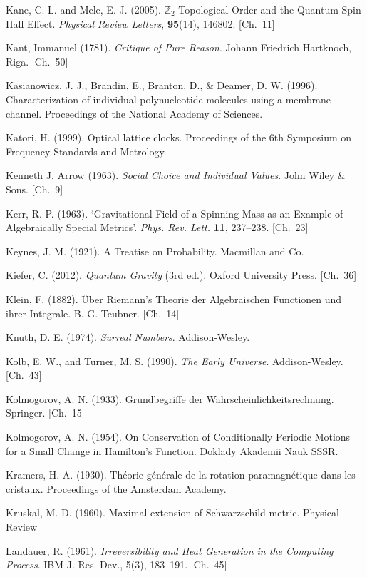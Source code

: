 \begin{list}{}{%
  \setlength{\leftmargin}{2em}%
  \setlength{\itemindent}{-2em}%
  \setlength{\itemsep}{0.35\baselineskip}%
  \setlength{\parsep}{0pt}%
  \setlength{\topsep}{0.5em}}
\item Kane, C. L. and Mele, E. J. (2005). $\mathbb{Z}_2$ Topological Order and the Quantum Spin Hall Effect. \textit{Physical Review Letters}, \textbf{95}(14), 146802. \hfill {\scriptsize [Ch.~11]}
\item Kant, Immanuel (1781). \textit{Critique of Pure Reason}. Johann Friedrich Hartknoch, Riga. \hfill {\scriptsize [Ch.~50]}
\item Kasianowicz, J. J., Brandin, E., Branton, D., \& Deamer, D. W. (1996). Characterization of individual polynucleotide molecules using a membrane channel. Proceedings of the National Academy of Sciences.
\item Katori, H. (1999). Optical lattice clocks. Proceedings of the 6th Symposium on Frequency Standards and Metrology.
\item Kenneth J. Arrow (1963). \textit{Social Choice and Individual Values}. John Wiley \& Sons. \hfill {\scriptsize [Ch.~9]}
\item Kerr, R. P. (1963). `Gravitational Field of a Spinning Mass as an Example of Algebraically Special Metrics'. \textit{Phys. Rev. Lett.} \textbf{11}, 237–238. \hfill {\scriptsize [Ch.~23]}
\item Keynes, J. M. (1921). A Treatise on Probability. Macmillan and Co.
\item Kiefer, C. (2012). \textit{Quantum Gravity} (3rd ed.). Oxford University Press. \hfill {\scriptsize [Ch.~36]}
\item Klein, F. (1882). \"Uber Riemann's Theorie der Algebraischen Functionen und ihrer Integrale. B. G. Teubner. \hfill {\scriptsize [Ch.~14]}
\item Knuth, D. E. (1974). \textit{Surreal Numbers}. Addison-Wesley.
\item Kolb, E. W., and Turner, M. S. (1990). \textit{The Early Universe}. Addison-Wesley. \hfill {\scriptsize [Ch.~43]}
\item Kolmogorov, A. N. (1933). Grundbegriffe der Wahrscheinlichkeitsrechnung. Springer. \hfill {\scriptsize [Ch.~15]}
\item Kolmogorov, A. N. (1954). On Conservation of Conditionally Periodic Motions for a Small Change in Hamilton's Function. Doklady Akademii Nauk SSSR.
\item Kramers, H. A. (1930). Th\'eorie g\'en\'erale de la rotation paramagn\'etique dans les cristaux. Proceedings of the Amsterdam Academy.
\item Kruskal, M. D. (1960). Maximal extension of Schwarzschild metric. Physical Review
\item Landauer, R. (1961). \textit{Irreversibility and Heat Generation in the Computing Process}. IBM J. Res. Dev., 5(3), 183–191. \hfill {\scriptsize [Ch.~45]}

\end{list}

